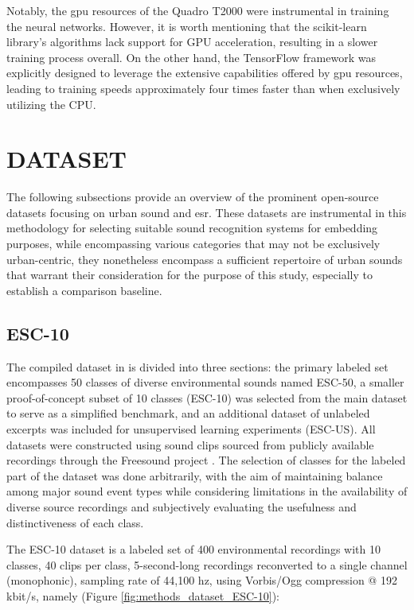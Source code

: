 Notably, the \gls{gpu} resources of the Quadro T2000 were instrumental in training the neural networks. However, it is worth mentioning that the scikit-learn library's algorithms lack support for GPU acceleration, resulting in a slower training process overall. On the other hand, the TensorFlow framework was explicitly designed to leverage the extensive capabilities offered by \gls{gpu} resources, leading to training speeds approximately four times faster than when exclusively utilizing the CPU.


\section{DATASET}
\label{sec:methods_dataset}

The following subsections provide an overview of the prominent open-source datasets focusing on urban sound and \gls{esr}. These datasets are instrumental in this methodology for selecting suitable sound recognition systems for embedding purposes, while encompassing various categories that may not be exclusively urban-centric, they nonetheless encompass a sufficient repertoire of urban sounds that warrant their consideration for the purpose of this study, especially to establish a comparison baseline.

\subsection{ESC-10}
\label{subsec:dataset_ESC-10}

The compiled dataset in \textcite{PiczakESC2015} is divided into three sections: the primary labeled set encompasses 50 classes of diverse environmental sounds named ESC-50, a smaller proof-of-concept subset of 10 classes (ESC-10) was selected from the main dataset to serve as a simplified benchmark, and an additional dataset of unlabeled excerpts was included for unsupervised learning experiments (ESC-US). All datasets were constructed using sound clips sourced from publicly available recordings through the Freesound project \cite{Font_freesound2013}. The selection of classes for the labeled part of the dataset was done arbitrarily, with the aim of maintaining balance among major sound event types while considering limitations in the availability of diverse source recordings and subjectively evaluating the usefulness and distinctiveness of each class.

The ESC-10 dataset is a labeled set of 400 environmental recordings with 10 classes, 40 clips per class, 5-second-long recordings reconverted to a single channel (monophonic), sampling rate of 44,100 \gls{hz},  using Vorbis/Ogg compression @ 192 \gls{k}bit/\gls{s}, namely (Figure \ref{fig:methods_dataset_ESC-10}):

